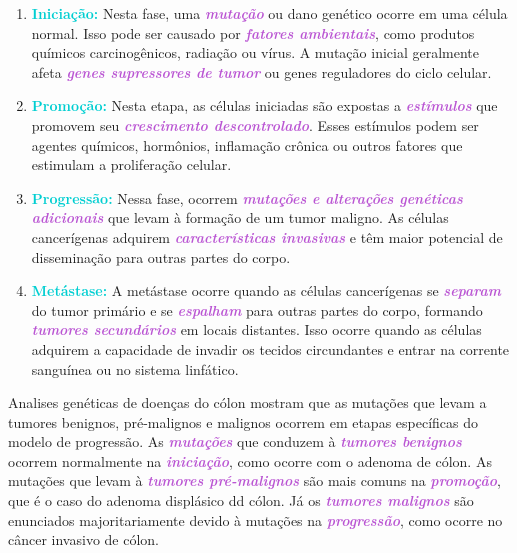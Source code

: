 \documentclass[11pt,a4paper]{article}
\begin{document}
    \begin{enumerate}
        \item \textcolor{DarkTurquoise}{\textbf{Iniciação:}} Nesta fase, uma \textcolor{MediumOrchid}{\textbf{\textit{mutação}}} ou dano genético ocorre em uma célula normal. Isso pode ser causado por \textcolor{MediumOrchid}{\textbf{\textit{fatores ambientais}}}, como produtos químicos carcinogênicos, radiação ou vírus. A mutação inicial geralmente afeta \textcolor{MediumOrchid}{\textbf{\textit{genes supressores de tumor}}} ou genes reguladores do ciclo celular.
        \item \textcolor{DarkTurquoise}{\textbf{Promoção:}} Nesta etapa, as células iniciadas são expostas a \textcolor{MediumOrchid}{\textbf{\textit{estímulos}}} que promovem seu \textcolor{MediumOrchid}{\textbf{\textit{crescimento descontrolado}}}. Esses estímulos podem ser agentes químicos, hormônios, inflamação crônica ou outros fatores que estimulam a proliferação celular.
        \item \textcolor{DarkTurquoise}{\textbf{Progressão:}} Nessa fase, ocorrem \textcolor{MediumOrchid}{\textbf{\textit{mutações e alterações genéticas adicionais}}} que levam à formação de um tumor maligno. As células cancerígenas adquirem \textcolor{MediumOrchid}{\textbf{\textit{características invasivas}}} e têm maior potencial de disseminação para outras partes do corpo.
        \item \textcolor{DarkTurquoise}{\textbf{Metástase:}} A metástase ocorre quando as células cancerígenas se \textcolor{MediumOrchid}{\textbf{\textit{separam}}} do tumor primário e se \textcolor{MediumOrchid}{\textbf{\textit{espalham}}} para outras partes do corpo, formando \textcolor{MediumOrchid}{\textbf{\textit{tumores secundários}}} em locais distantes. Isso ocorre quando as células adquirem a capacidade de invadir os tecidos circundantes e entrar na corrente sanguínea ou no sistema linfático.
    \end{enumerate}

    Analises genéticas de doenças do cólon mostram que as mutações que levam a tumores benignos, pré-malignos e malignos ocorrem em etapas específicas do modelo de progressão. As \textcolor{MediumOrchid}{\textbf{\textit{mutações}}} que conduzem à \textcolor{MediumOrchid}{\textbf{\textit{tumores benignos}}} ocorrem normalmente na \textcolor{MediumOrchid}{\textbf{\textit{iniciação}}}, como ocorre com o adenoma de cólon. As mutações que levam à \textcolor{MediumOrchid}{\textbf{\textit{tumores pré-malignos}}} são mais comuns na \textcolor{MediumOrchid}{\textbf{\textit{promoção}}}, que é o caso do adenoma displásico dd cólon. Já os \textcolor{MediumOrchid}{\textbf{\textit{tumores malignos}}} são enunciados majoritariamente devido à mutações na \textcolor{MediumOrchid}{\textbf{\textit{progressão}}}, como ocorre no câncer invasivo de cólon. 
\end{document}
